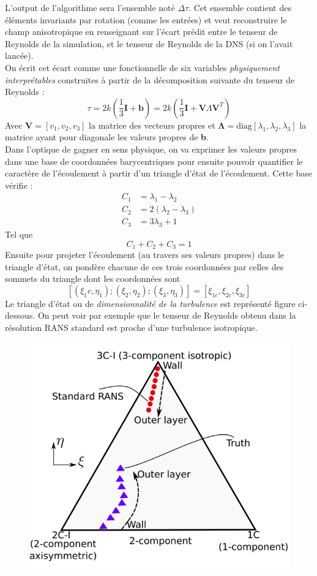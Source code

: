 \documentclass[a4paper,12pt]{report}
\newcommand{\bepar}[1]{
	\left( #1 \right)  
}
\newcommand{\becro}[1]{
	\left[ #1 \right]  
}
\numberwithin{equation}{section} %
\begin{document}
\noindent L'output de l'algorithme sera l'ensemble noté $ \Delta \tau $. Cet ensemble contient des éléments invariants par rotation (comme les entrées) et veut reconstruire le champ anisotropique en renseignant sur l'écart prédit entre le tenseur de Reynolds de la simulation, et le tenseur de Reynolds de la DNS (si on l'avait lancée). \\
On écrit cet écart comme une fonctionnelle de six variables \textit{physiquement interprétables} construites à partir de la décomposition suivante du tenseur de Reynolds :
$$ \tau = 2k\bepar{\frac{1}{3} \textbf{I} + \textbf{b}} = 2k \bepar{\frac{1}{3} \textbf{I} + \textbf{V}\Lambda\textbf{V}^T}$$ 
Avec $\textbf{V} = \becro{v_1, v_2, v_3}$ la matrice des vecteurs propres et $\mathbf{\Lambda} =\text{diag}\becro{\lambda_1, \lambda_2, \lambda_3}$ la matrice ayant pour diagonale les valeurs propres de \textbf{b}.\\
Dans l'optique de gagner en sens physique, on va exprimer les valeurs propres dans une base de coordonnées barycentriques pour ensuite pouvoir quantifier le caractère de l'écoulement à partir d'un triangle d'état de l'écoulement. Cette base vérifie : \begin{align*}
C_1 &= \lambda_1 - \lambda_2\\
C_2 &= 2(\lambda_2 - \lambda_3)\\
C_3 &= 3\lambda_3 +1
\end{align*}
Tel que $$C_1 + C_2 + C_3 = 1 $$  
Ensuite pour projeter l'écoulement (au travers ses valeurs propres) dans le triangle d'état, on pondère chacune de ces trois coordonnées par celles des sommets du triangle dont les coordonnées sont $$\becro{(\xi_1c, \eta_1); (\xi_2, \eta_2); (\xi_3, \eta_3)} = \becro{\xi_{1c}, \xi_{2c}, \xi_{3c}}$$ Le triangle d'état ou de \textit{dimensionnalité de la turbulence} est représenté figure ci-dessous. On peut voir par exemple que le tenseur de Reynolds obtenu dans la résolution RANS standard est proche d'une turbulence isotropique.

\begin{figure}[ht!]
\centering
\includegraphics[scale=0.41]{triangle_vertices.png}
\end{figure}
\end{document}
